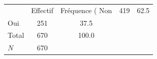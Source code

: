 {
\def\sym#1{\ifmmode^{#1}\else\(^{#1}\)\fi}
\begin{tabular}{l*{1}{cc}}
\toprule
            &    Effectif&Fréquence (%
\midrule
Non         &         419&        62.5\\
Oui         &         251&        37.5\\
Total       &         670&       100.0\\
\midrule
\(N\)       &         670&            \\
\bottomrule
\end{tabular}
}
